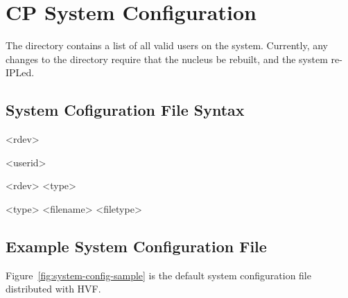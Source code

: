 \cbstart
\chapter{CP System Configuration}
\label{chap:system-config}
The directory contains a list of all valid users on the system.  Currently,
any changes to the directory require that the nucleus be rebuilt, and the
system re-IPLed.

\section{System Cofiguration File Syntax}
\begin{syntdiag}
  <rdev>
\end{syntdiag}

\begin{syntdiag}
  <userid>
\end{syntdiag}

\begin{syntdiag}
 <rdev> <type>
\end{syntdiag}

\begin{syntdiag}
  <type> <filename> <filetype>
\end{syntdiag}

\section{Example System Configuration File}
Figure~\ref{fig:system-config-sample} is the default system configuration
file distributed with HVF.

\begin{figure*}[htb]
\small

\captionfont
\caption{\capfont Example system configuration file.}
\label{fig:system-config-sample}
\end{figure*}

\cbend
